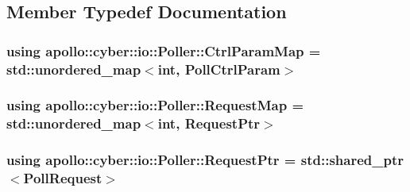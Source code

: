 \subsection{Member Typedef Documentation}
\hypertarget{classapollo_1_1cyber_1_1io_1_1Poller_a8b5069a91f056c7b473bcfd02ff2aaad}{
\subsubsection[{Ctrl\-Param\-Map}]{\setlength{\rightskip}{0pt plus 5cm}using {\bf apollo\-::cyber\-::io\-::\-Poller\-::\-Ctrl\-Param\-Map} =  std\-::unordered\-\_\-map$<$int, {\bf Poll\-Ctrl\-Param}$>$}}\label{classapollo_1_1cyber_1_1io_1_1Poller_a8b5069a91f056c7b473bcfd02ff2aaad}
\hypertarget{classapollo_1_1cyber_1_1io_1_1Poller_a46cf3c8b1cd0c34c0daf7dd076cddc63}{
\subsubsection[{Request\-Map}]{\setlength{\rightskip}{0pt plus 5cm}using {\bf apollo\-::cyber\-::io\-::\-Poller\-::\-Request\-Map} =  std\-::unordered\-\_\-map$<$int, {\bf Request\-Ptr}$>$}}\label{classapollo_1_1cyber_1_1io_1_1Poller_a46cf3c8b1cd0c34c0daf7dd076cddc63}
\hypertarget{classapollo_1_1cyber_1_1io_1_1Poller_afca2e09142da5f57cfca966402953bf2}{
\subsubsection[{Request\-Ptr}]{\setlength{\rightskip}{0pt plus 5cm}using {\bf apollo\-::cyber\-::io\-::\-Poller\-::\-Request\-Ptr} =  std\-::shared\-\_\-ptr$<${\bf Poll\-Request}$>$}}\label{classapollo_1_1cyber_1_1io_1_1Poller_afca2e09142da5f57cfca966402953bf2}


